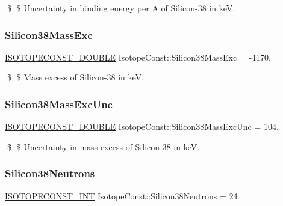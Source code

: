 \$ \$ Uncertainty in binding energy per A of Silicon-\/38 in keV. \mbox{\label{group___isotope_const-_silicon-_si38_ga5aba73a582c623023c9a9f0c04732fad}} 
\subsubsection{\texorpdfstring{Silicon38\+Mass\+Exc}{Silicon38MassExc}}
{\footnotesize\ttfamily \mbox{\hyperlink{group___isotope_const-_macros_ga8f45a7272ce02c0b4c65c44636ed719a}{I\+S\+O\+T\+O\+P\+E\+C\+O\+N\+S\+T\+\_\+\+D\+O\+U\+B\+LE}} Isotope\+Const\+::\+Silicon38\+Mass\+Exc = -\/4170.}

\$ \$ Mass excess of Silicon-\/38 in keV. \mbox{\label{group___isotope_const-_silicon-_si38_ga38b3d808b22777939b806856908a403e}} 
\subsubsection{\texorpdfstring{Silicon38\+Mass\+Exc\+Unc}{Silicon38MassExcUnc}}
{\footnotesize\ttfamily \mbox{\hyperlink{group___isotope_const-_macros_ga8f45a7272ce02c0b4c65c44636ed719a}{I\+S\+O\+T\+O\+P\+E\+C\+O\+N\+S\+T\+\_\+\+D\+O\+U\+B\+LE}} Isotope\+Const\+::\+Silicon38\+Mass\+Exc\+Unc = 104.}

\$ \$ Uncertainty in mass excess of Silicon-\/38 in keV. \mbox{\label{group___isotope_const-_silicon-_si38_ga56f3410779583580f849e56418324a6b}} 
\subsubsection{\texorpdfstring{Silicon38\+Neutrons}{Silicon38Neutrons}}
{\footnotesize\ttfamily \mbox{\hyperlink{group___isotope_const-_macros_ga5f18360b3e99483a35c32d789e62621c}{I\+S\+O\+T\+O\+P\+E\+C\+O\+N\+S\+T\+\_\+\+I\+NT}} Isotope\+Const\+::\+Silicon38\+Neutrons = 24}

